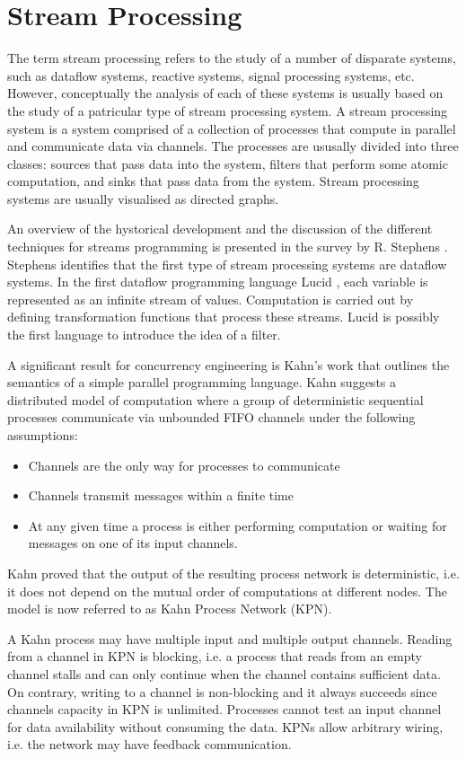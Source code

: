     \section{Stream Processing}
The term stream processing refers to the study of a number of disparate systems, such as dataflow systems, reactive systems, signal processing systems, etc. However, conceptually the analysis of each of these systems is usually based on the study of a patricular type of stream processing system. A stream processing system is a system comprised of a collection of processes that compute in parallel and communicate data via channels. The processes are ususally divided into three classes: sources that pass data into the system, filters that perform some atomic computation, and sinks that pass data from the system. Stream processing systems are usually visualised as directed graphs.

An overview of the hystorical development and the discussion of the different techniques for streams programming is presented in the survey by R. Stephens \cite{stephens97}. Stephens identifies that the first type of stream processing systems are dataflow systems. In the first dataflow programming language Lucid \cite{lucid}, each variable is represented as an infinite stream of values. Computation is carried out by defining transformation functions that process these streams. Lucid is possibly the first language to introduce the idea of a filter.

A significant result for concurrency engineering is Kahn's work \cite{kahn74} that outlines the semantics of a simple parallel programming language. Kahn suggests a distributed model of computation where a group of deterministic sequential processes communicate via unbounded FIFO channels under the following assumptions:
\begin{itemize}
\item Channels are the only way for processes to communicate
\item Channels transmit messages within a finite time
\item At any given time a process is either performing computation or waiting for messages on one of its input channels.
\end{itemize}
Kahn proved that the output of the resulting process network is deterministic, i.e. it does not depend on the mutual order of computations at different nodes. The model is now referred to as Kahn Process Network (KPN).

A Kahn process may have multiple input and multiple output channels. Reading from a channel in KPN is blocking, i.e. a process that reads from an empty channel stalls and can only continue when the channel contains sufficient data.  On contrary, writing to a channel is non-blocking and it always succeeds since channels capacity in KPN is unlimited. Processes cannot test an input channel for data availability without consuming the data. KPNs allow arbitrary wiring, i.e. the network may have feedback communication.

